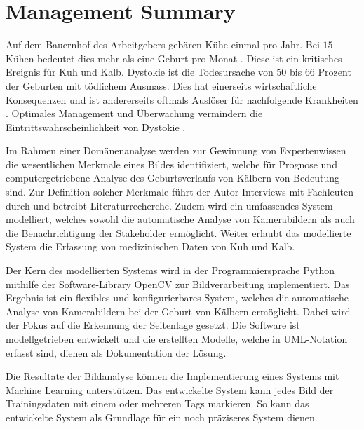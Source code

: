 

\chapter{Management Summary}

Auf dem Bauernhof des Arbeitgebers gebären Kühe einmal pro Jahr. Bei $15$ Kühen bedeutet dies mehr als eine Geburt pro Monat \citep{Muller2019}. Diese ist ein kritisches Ereignis für Kuh und Kalb. \gls{Dystokie} ist die Todesursache von $50$ bis $66$ Prozent der Geburten mit tödlichem Ausmass. Dies hat einerseits wirtschaftliche Konsequenzen \citep[S. 1]{Saint-Dizier2015} und ist andererseits oftmals Auslöser für nachfolgende Krankheiten \citep[S. 1]{Lange2017}.  Optimales Management und Überwachung vermindern die Eintrittswahrscheinlichkeit von Dystokie \citep[S. 1]{Lange2017}. 

Im Rahmen einer Domänenanalyse werden zur Gewinnung von Expertenwissen die wesentlichen Merkmale eines Bildes  identifiziert, welche für Prognose und computergetriebene Analyse des Geburtsverlaufs von Kälbern von Bedeutung sind. Zur Definition solcher Merkmale führt der Autor Interviews mit Fachleuten durch und betreibt Literaturrecherche. Zudem wird ein umfassendes System modelliert, welches sowohl die automatische Analyse von Kamerabildern als auch die Benachrichtigung der Stakeholder ermöglicht. Weiter erlaubt das modellierte System die Erfassung von medizinischen Daten von Kuh und Kalb.

Der Kern des modellierten Systems wird in der Programmiersprache Python mithilfe der Software-Library OpenCV zur Bildverarbeitung implementiert. Das Ergebnis ist ein flexibles und konfigurierbares System, welches die automatische Analyse von Kamerabildern bei der Geburt von Kälbern ermöglicht. Dabei wird der Fokus auf die Erkennung der Seitenlage gesetzt. Die Software ist modellgetrieben entwickelt und die erstellten Modelle, welche in UML-Notation erfasst sind, dienen als Dokumentation der Lösung.

Die Resultate der Bildanalyse können die Implementierung eines Systems mit Machine Learning unterstützen. Das entwickelte System kann jedes Bild der Trainingsdaten mit einem oder mehreren \glqq{}Tags\grqq{} markieren. So kann das entwickelte System als Grundlage für ein noch präziseres System dienen.

